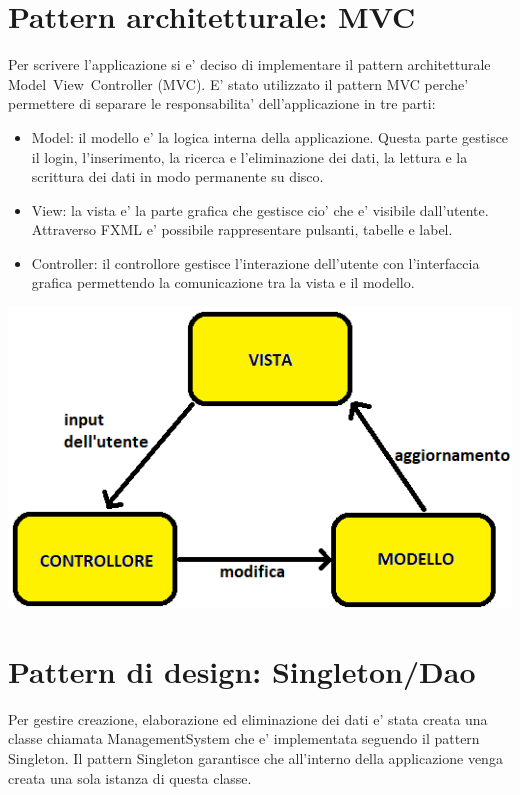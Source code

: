 \documentclass[ 4paper,11pt,openany]{book}
\begin{document}
\section{Pattern architetturale: MVC}
Per scrivere l'applicazione si e' deciso di implementare il pattern architetturale Model~View~Controller (MVC).
E' stato utilizzato il pattern MVC perche' permettere di separare le responsabilita' dell'applicazione in tre parti:
\begin{itemize}
    \item Model: il modello e' la logica interna della applicazione. Questa parte gestisce il login, l'inserimento, la ricerca e l'eliminazione dei dati, la lettura e la scrittura dei dati in modo permanente su disco.
    \item View: la vista e' la parte grafica che gestisce cio' che e' visibile dall'utente. Attraverso FXML e' possibile rappresentare pulsanti, tabelle e label.
    \item Controller: il controllore gestisce l'interazione dell'utente con l'interfaccia grafica permettendo la comunicazione tra la vista e il modello.
\end{itemize}
\begin{center}
\includegraphics{mvc.png}
\end{center}

\section{Pattern di design: Singleton/Dao}
Per gestire creazione, elaborazione ed eliminazione dei dati e' stata creata una classe chiamata ManagementSystem che e' implementata seguendo il pattern Singleton.
Il pattern Singleton garantisce che all'interno della applicazione venga creata una sola istanza di questa classe.
\end{document}
